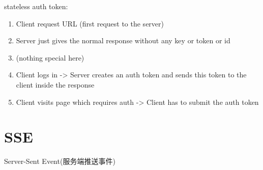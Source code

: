 stateless auth token:

\begin{enumerate}
\item Client request URL (first request to the server)
\item Server just gives the normal response without any key or token or id
\item (nothing special here)
\item Client logs in -> Server creates an auth token and sends this token to the client inside the response
\item Client visits page which requires auth -> Client has to submit the auth token
\end{enumerate}


\section{SSE} Server-Sent Event(服务端推送事件)




